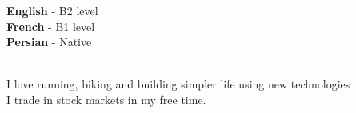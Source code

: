 \begin{minipage}[t]{0.45\textwidth}
    \vspace{-\baselineskip} %


    \textbf{English} - B2 level\\
    \textbf{French} - B1 level\\
    \textbf{Persian} - Native\\\
\end{minipage}
\hfill
\begin{minipage}[t]{0.45\textwidth}
    \vspace{-\baselineskip} %


    I love running, biking and building simpler life using new technologies\\
    I trade in stock markets in my free time.
\end{minipage}

